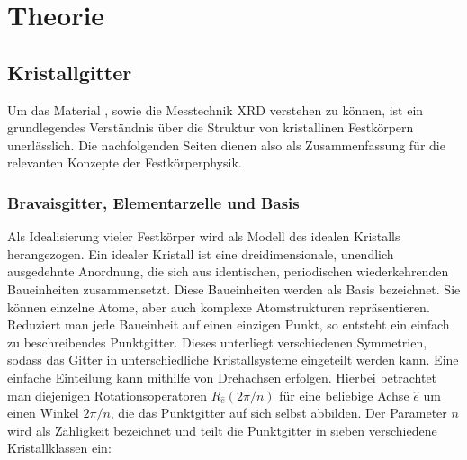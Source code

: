 \section{Theorie}
\subsection{Kristallgitter}
Um das Material , sowie die Messtechnik XRD verstehen zu können, ist ein grundlegendes Verständnis über die Struktur von kristallinen Festkörpern unerlässlich. Die nachfolgenden Seiten dienen also als Zusammenfassung für die relevanten Konzepte der Festkörperphysik. 

\subsubsection{Bravaisgitter, Elementarzelle und Basis}
Als Idealisierung vieler Festkörper wird als Modell des idealen Kristalls herangezogen. Ein idealer Kristall ist eine dreidimensionale, unendlich ausgedehnte Anordnung, die sich aus identischen, periodischen wiederkehrenden Baueinheiten zusammensetzt. Diese Baueinheiten werden als Basis bezeichnet. Sie können einzelne Atome, aber auch komplexe Atomstrukturen repräsentieren. Reduziert man jede Baueinheit auf einen einzigen Punkt, so entsteht ein einfach zu beschreibendes Punktgitter. \autocite[49]{Hunklinger} Dieses unterliegt verschiedenen Symmetrien, sodass das Gitter in unterschiedliche Kristallsysteme eingeteilt werden kann. Eine einfache Einteilung kann mithilfe von Drehachsen erfolgen. Hierbei betrachtet man diejenigen Rotationsoperatoren $R_{\hat{e}}(2\pi / n)$ für eine beliebige Achse $\hat{e}$ um einen Winkel $2 \pi /n$, die das Punktgitter auf sich selbst abbilden. Der Parameter $n$ wird als Zähligkeit bezeichnet und teilt die Punktgitter in sieben verschiedene Kristallklassen ein: \autocite[53]{Hunklinger}
